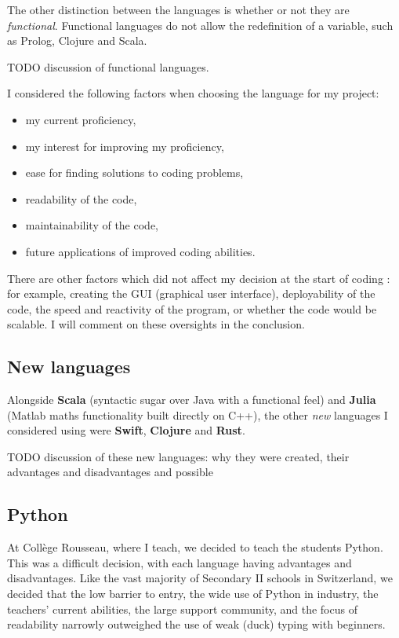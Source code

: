 \documentclass[10pt]{article}
\begin{document}
The other distinction between the languages is whether or not they are \emph{functional}. Functional languages do not allow the redefinition of a variable, such as Prolog, Clojure and Scala. 


TODO discussion of functional languages.

I considered the following factors when choosing the language for my project:
\begin{itemize}
\item my current proficiency,
\item my interest for improving my proficiency,
\item ease for finding solutions to coding problems,
\item readability of the code,
\item maintainability of the code,
\item future applications of improved coding abilities.
\end{itemize}

There are other factors which did not affect my decision at the start of coding : for example, creating the GUI (graphical user interface), deployability of the code, the speed and reactivity of the program, or whether the code would be scalable. I will comment on these oversights in the conclusion.



\subsection{New languages}
Alongside \textbf{Scala} (syntactic sugar over Java with a functional feel) and \textbf{Julia} (Matlab maths functionality built directly on C++), the other \emph{new} languages I considered using were \textbf{Swift}, \textbf{Clojure} and \textbf{Rust}.

TODO discussion of these new languages: why they were created, their advantages and disadvantages and possible 

\subsection{Python}
At Collège Rousseau, where I teach, we decided to teach the students Python. This was a difficult decision, with each language having advantages and disadvantages. Like the vast majority of Secondary II schools in Switzerland, we decided that the low barrier to entry, the wide use of Python in industry, the teachers' current abilities, the large support community, and the focus of readability narrowly outweighed the use of weak (duck) typing with beginners.
\end{document}
